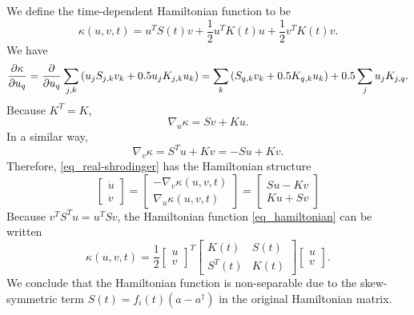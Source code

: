 \documentclass[11pt]{article}
\begin{document}
We define the time-dependent Hamiltonian function to be
\begin{equation}\label{eq_hamiltonian}
\kappa(u,v,t) = u^T S(t) v + \frac{1}{2} u^T K(t) u + \frac{1}{2} v^T K(t) v.
\end{equation}
We have
\[
\frac{\p\kappa}{\p u_q} =
%
\frac{\p}{\p u_q} \sum_{j,k} \left( u_j S_{j,k} v_k + 0.5 u_j K_{j,k} u_k \right) =
%
\sum_{k} \left( S_{q,k} v_k + 0.5 K_{q,k} u_k \right) + 0.5 \sum_{j} u_j K_{j,q}.
\]
Because $K^T = K$,
\[
\nabla_u \kappa = S v + K u.
\]
In a similar way,
\[
\nabla_v \kappa = S^T u + K v = -S u + Kv.
\]
Therefore, \eqref{eq_real-shrodinger} has the Hamiltonian structure
\begin{equation}\label{eq_hamiltonian-form}
  \begin{bmatrix}
    \dot{u} \\   \dot{v}
  \end{bmatrix} =
  \begin{bmatrix}
    -\nabla_v \kappa(u,v,t)\\
    \nabla_u \kappa(u,v,t)
  \end{bmatrix} =
%
  \begin{bmatrix}
    Su - Kv \\
    Ku + Sv
  \end{bmatrix}
\end{equation}
Because $v^TS^Tu = u^TSv$, the Hamiltonian function \eqref{eq_hamiltonian} can be written
\begin{equation}\label{eq_hamiltonian-time}
\kappa(u,v,t) = \frac{1}{2} \begin{bmatrix} u \\ v \end{bmatrix}^T
%
\begin{bmatrix}
  K(t) & S(t) \\ S^T(t) & K(t)
\end{bmatrix}
\begin{bmatrix} u \\ v \end{bmatrix}.
\end{equation}
We conclude that the Hamiltonian function is non-separable due to the skew-symmetric term
$S(t) =f_i(t) ( a- a^\dag)$ in the original Hamiltonian matrix.
\end{document}
